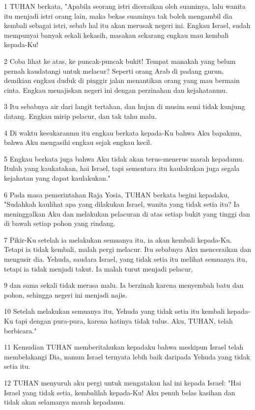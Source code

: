 \par 1 TUHAN berkata, "Apabila seorang istri diceraikan oleh suaminya, lalu wanita itu menjadi istri orang lain, maka bekas suaminya tak boleh mengambil dia kembali sebagai istri, sebab hal itu akan merusak negeri ini. Engkau Israel, sudah mempunyai banyak sekali kekasih, masakan sekarang engkau mau kembali kepada-Ku!
\par 2 Coba lihat ke atas, ke puncak-puncak bukit! Tempat manakah yang belum pernah kaudatangi untuk melacur? Seperti orang Arab di padang gurun, demikian engkau duduk di pinggir jalan menantikan orang yang mau bermain cinta. Engkau menajiskan negeri ini dengan perzinahan dan kejahatanmu.
\par 3 Itu sebabnya air dari langit tertahan, dan hujan di musim semi tidak kunjung datang. Engkau mirip pelacur, dan tak tahu malu.
\par 4 Di waktu kesukaranmu itu engkau berkata kepada-Ku bahwa Aku bapakmu, bahwa Aku mengasihi engkau sejak engkau kecil.
\par 5 Engkau berkata juga bahwa Aku tidak akan terus-menerus marah kepadamu. Itulah yang kaukatakan, hai Israel, tapi sementara itu kaulakukan juga segala kejahatan yang dapat kaulakukan."
\par 6 Pada masa pemerintahan Raja Yosia, TUHAN berkata begini kepadaku, "Sudahkah kaulihat apa yang dilakukan Israel, wanita yang tidak setia itu? Ia meninggalkan Aku dan melakukan pelacuran di atas setiap bukit yang tinggi dan di bawah setiap pohon yang rindang.
\par 7 Pikir-Ku setelah ia melakukan semuanya itu, ia akan kembali kepada-Ku. Tetapi ia tidak kembali, malah pergi melacur. Itu sebabnya Aku menceraikan dan mengusir dia. Yehuda, saudara Israel, yang tidak setia itu melihat semuanya itu, tetapi ia tidak menjadi takut. Ia malah turut menjadi pelacur,
\par 9 dan sama sekali tidak merasa malu. Ia berzinah karena menyembah batu dan pohon, sehingga negeri ini menjadi najis.
\par 10 Setelah melakukan semuanya itu, Yehuda yang tidak setia itu kembali kepada-Ku tapi dengan pura-pura, karena hatinya tidak tulus. Aku, TUHAN, telah berbicara."
\par 11 Kemudian TUHAN memberitahukan kepadaku bahwa meskipun Israel telah membelakangi Dia, namun Israel ternyata lebih baik daripada Yehuda yang tidak setia itu.
\par 12 TUHAN menyuruh aku pergi untuk mengatakan hal ini kepada Israel: "Hai Israel yang tidak setia, kembalilah kepada-Ku! Aku penuh belas kasihan dan tidak akan selamanya marah kepadamu.
